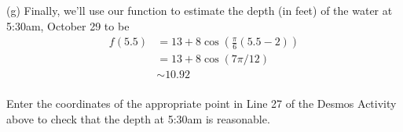 \documentclass{ximera}
\begin{document}
\begin{example}
\begin{explanation}
(g) Finally, we'll use our function to estimate the depth (in feet) of the water at 5:30am, October 29 to be
\begin{align*}
   f(5.5)   & = 13 + 8 \cos \left(  \frac{\pi}{6} \left(5.5 - 2 \right) \right) \\ 
           & = 13 + 8 \cos (7\pi / 12)  \\ 
           &  \sim  10.92 \\
         \end{align*}

\begin{question} \label{Qdgtr6y7y}
Enter the coordinates of the appropriate point in Line 27 of the Desmos Activity above to check that the depth at 5:30am is reasonable.
\end{question}
\end{explanation}

\end{example}
\end{document}

